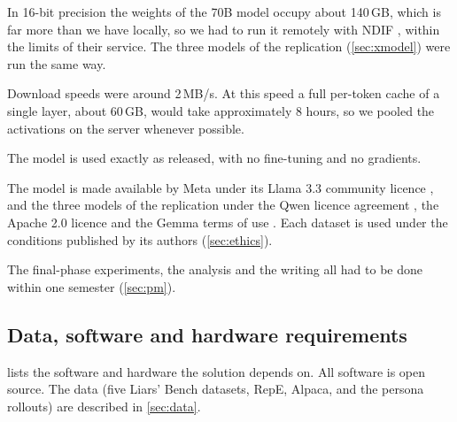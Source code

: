 \begin{description}[leftmargin=1.2em, labelindent=0em, itemsep=2pt]
\item[C1: Model access.] In 16-bit precision the weights of the 70B model occupy about 140\,GB,
  which is far more than we have locally, so we had to run it remotely with NDIF
  \cite{fiottokaufman2024nnsight}, within the limits of their service. The three models of the
  replication (\cref{sec:xmodel}) were run the same way.
\item[C2: Bandwidth.] Download speeds were around 2\,MB/s. At this speed a full per-token cache of
  a single layer, about 60\,GB, would take approximately 8 hours, so we pooled the activations on
  the server whenever possible.
\item[C3: No training of the model.] The model is used exactly as released, with no fine-tuning and
  no gradients.
\item[C4: Licences.] The model is made available by Meta under its Llama 3.3 community licence
  \cite{meta2024llama33}, and the three models of the replication under the Qwen licence agreement
  \cite{qwen2024qwen25}, the Apache 2.0 licence \cite{mistral2025small31} and the Gemma terms of use
  \cite{gemma2025gemma3}. Each dataset is used under the conditions published by its authors
  (\cref{sec:ethics}).
\item[C5: Time.] The final-phase experiments, the analysis and the writing all had to be done within
  one semester (\cref{sec:pm}).
\end{description}

\subsection{Data, software and hardware requirements}

 lists the software and hardware the solution depends on. All software is
open source. The data (five Liars' Bench datasets, RepE, Alpaca, and the persona rollouts) are
described in \cref{sec:data}.

